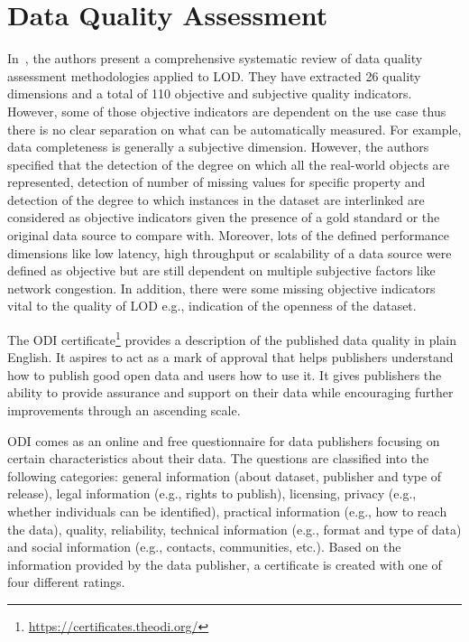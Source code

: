 
\section{Data Quality Assessment}
\label{section:data-quality-assessment}
In~\cite{Zaveri:SemWebJorunal:12}, the authors present a comprehensive systematic review of data quality assessment methodologies applied to LOD. They have extracted 26 quality dimensions and a total of 110 objective and subjective quality indicators. However, some of those objective indicators are dependent on the use case thus there is no clear separation on what can be automatically measured. For example, data completeness is generally a subjective dimension. However, the authors specified that the detection of the degree on which all the real-world objects are represented, detection of number of missing values for specific property and detection of the degree to which instances in the dataset are interlinked are considered as objective indicators given the presence of a gold standard or the original data source to compare with. Moreover, lots of the defined performance dimensions like low latency, high throughput or scalability of a data source were defined as objective but are still dependent on multiple subjective factors like network congestion. In addition, there were some missing objective indicators vital to the quality of LOD e.g., indication of the openness of the dataset.

The ODI certificate\footnote{\url{https://certificates.theodi.org/}} provides a description of the published data quality in plain English. It aspires to act as a mark of approval that helps publishers understand how to publish good open data and users how to use it. It gives publishers the ability to provide assurance and support on their data while encouraging further improvements through an ascending scale.

ODI comes as an online and free questionnaire for data publishers focusing on certain characteristics about their data. The questions are classified into the following categories: general information (about dataset, publisher and type of release), legal information (e.g., rights to publish), licensing, privacy (e.g., whether individuals can be identified), practical information (e.g., how to reach the data), quality, reliability, technical information (e.g., format and type of data) and social information (e.g., contacts, communities, etc.). Based on the information provided  by the data  publisher, a certificate is created with one of four different ratings.

